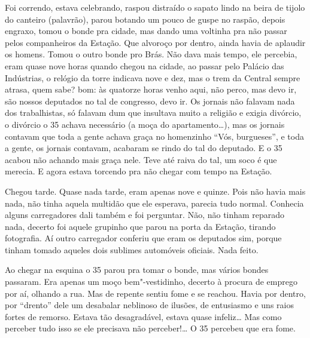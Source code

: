 \begin{linenumbers}
Foi correndo, estava celebrando, raspou distraído o sapato lindo na
beira de tijolo do canteiro (palavrão), parou botando um pouco de guspe
no raspão, depois engraxo, tomou o bonde pra cidade, mas dando uma
voltinha pra não passar pelos companheiros da Estação. Que alvoroço por
dentro, ainda havia de aplaudir os homens. Tomou o outro bonde pro Brás.
Não dava mais tempo, ele percebia, eram quase nove horas quando chegou
na cidade, ao passar pelo Palácio das Indústrias, o relógio da torre
indicava nove e dez, mas o trem da Central sempre atrasa, quem sabe?
bom: às quatorze horas venho aqui, não perco, mas devo ir, são nossos
deputados no tal de congresso, devo ir. Os jornais não falavam nada dos
trabalhistas, só falavam dum que insultava muito a religião e exigia
divórcio, o divórcio o 35 achava necessário (a moça do apartamento\ldots{}),
mas os jornais contavam que toda a gente achava graça no homenzinho
``Vós, burgueses'', e toda a gente, os jornais contavam, acabaram se
rindo do tal do deputado. E o 35 acabou não achando mais graça nele.
Teve até raiva do tal, um soco é que merecia. E agora estava torcendo
pra não chegar com tempo na Estação.

Chegou tarde. Quase nada tarde, eram apenas nove e quinze. Pois não
havia mais nada, não tinha aquela multidão que ele esperava, parecia
tudo normal. Conhecia alguns carregadores dali também e foi perguntar.
Não, não tinham reparado nada, decerto foi aquele grupinho que parou na
porta da Estação, tirando fotografia. Aí outro carregador conferiu que
eram os deputados sim, porque tinham tomado aqueles dois sublimes
automóveis oficiais. Nada feito.

Ao chegar na esquina o 35 parou pra tomar o bonde, mas vários bondes
passaram. Era apenas um moço bem"-vestidinho, decerto à procura de
emprego por aí, olhando a rua. Mas de repente sentiu fome e se reachou.
Havia por dentro, por ``drento'' dele um desabalar neblinoso de ilusões,
de entusiasmo e uns raios fortes de remorso. Estava tão desagradável,
estava quase infeliz\ldots{} Mas como perceber tudo isso se ele precisava não
perceber!\ldots{} O 35 percebeu que era fome.


\end{linenumbers}
